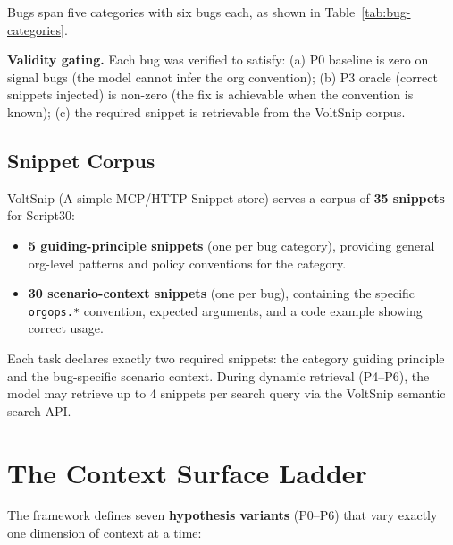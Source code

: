 \documentclass[10pt,a4paper,twocolumn]{article}
\begin{document}
Bugs span five categories with six bugs each, as shown in Table~\ref{tab:bug-categories}.

\textbf{Validity gating.}
Each bug was verified to satisfy: (a) P0 baseline is zero on signal bugs (the model cannot infer the org convention); (b) P3 oracle (correct snippets injected) is non-zero (the fix is achievable when the convention is known); (c) the required snippet is retrievable from the VoltSnip corpus.

\subsection{Snippet Corpus}
\label{sec:snippet-corpus}

VoltSnip (A simple MCP/HTTP Snippet store) serves a corpus of \textbf{35 snippets} for Script30:
\begin{itemize}
    \item \textbf{5 guiding-principle snippets} (one per bug category), providing general org-level patterns and policy conventions for the category.
    \item \textbf{30 scenario-context snippets} (one per bug), containing the specific \texttt{orgops.*} convention, expected arguments, and a code example showing correct usage.
\end{itemize}

Each task declares exactly two required snippets: the category guiding principle and the bug-specific scenario context.
During dynamic retrieval (P4--P6), the model may retrieve up to 4 snippets per search query via the VoltSnip semantic search API.

\section{The Context Surface Ladder}
\label{sec:ladder}

The framework defines seven \textbf{hypothesis variants} (P0--P6) that vary exactly one dimension of context at a time:
\end{document}
